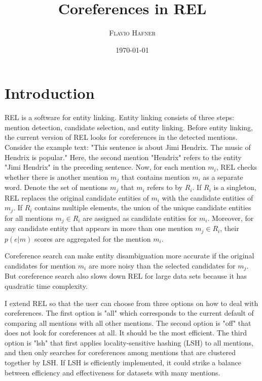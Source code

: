 \documentclass[a4paper,11pt]{article}
\numberwithin{equation}{section} %
\begin{document}
\title{Coreferences in REL
}



\author{\textsc{Flavio Hafner}
}

\date{\today}


\clearpage
\maketitle

\tableofcontents



\section{Introduction}

REL is a software for entity linking. Entity linking consists of three steps: mention detection, candidate selection, and entity linking. Before entity linking, the current version of REL looks for coreferences in the detected mentions. Consider the example text: "This sentence is about Jimi Hendrix. The music of Hendrix is popular." Here, the second mention "Hendrix" refers to the entity "Jimi Hendrix" in the preceding sentence. Now, for each mention $m_i$, REL checks whether there is another mention $m_j$ that contains mention $m_i$ as a separate word. Denote the set of mentions $m_j$ that $m_i$ refers to by $R_i$.
If $R_i$ is a singleton, REL replaces the original candidate entities of $m_i$ with the candidate entities of $m_j$.
If $R_i$ contains multiple elements, the union of the unique candidate entities for all mentions  $m_j \in R_i$ are assigned as candidate entities for $m_i$. Moreover, for any candidate entity that appears in more than one mention $m_j \in R_i$, their $p(e|m)$ scores are aggregated for the mention $m_i$.

Coreference search can make entity disambiguation more accurate if the original candidates for mention $m_i$ are more noisy than the selected candidates for $m_j$. 
But coreference search also slows down REL for large data sets because it has quadratic time complexity.

I extend REL so that the user can choose from three options on how to deal with coreferences. The first option is "all" which corresponds to the current default of comparing all mentions with all other mentions. The second option is "off" that does not look for coreferences at all. It should be the most efficient. The third option is "lsh" that first applies locality-sensitive hashing (LSH) to all mentions, and then only searches for coreferences among mentions that are clustered together by LSH. If LSH is efficiently implemented, it could strike a balance between efficiency and effectiveness for datasets with many mentions. 
\end{document}
